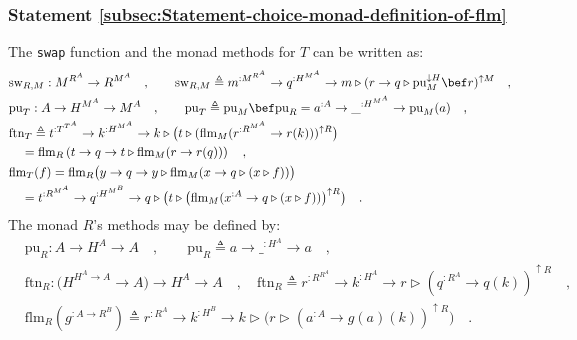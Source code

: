 \subsubsection{Statement \label{subsec:Statement-choice-monad-definition-of-flm}\ref{subsec:Statement-choice-monad-definition-of-flm}}

The \lstinline!swap! function and the monad methods for $T$ can
be written as:
\begin{align}
 & \text{sw}_{R,M}:M^{R^{A}}\rightarrow R^{M^{A}}\quad,\quad\quad\text{sw}_{R,M}\triangleq m^{:M^{R^{A}}}\rightarrow q^{:H^{M^{A}}}\rightarrow m\triangleright(r\rightarrow q\triangleright\text{pu}_{M}^{\downarrow H}\bef r)^{\uparrow M}\quad,\label{eq:rigid-monad-short-formula-for-swap}\\
 & \text{pu}_{T}:A\rightarrow H^{M^{A}}\rightarrow M^{A}\quad,\quad\quad\text{pu}_{T}\triangleq\text{pu}_{M}\bef\text{pu}_{R}=a^{:A}\rightarrow\_^{:H^{M^{A}}}\rightarrow\text{pu}_{M}(a)\quad,\nonumber \\
 & \text{ftn}_{T}\triangleq t^{:T^{T^{A}}}\rightarrow k^{:H^{M^{A}}}\rightarrow k\triangleright\big(t\triangleright(\text{flm}_{M}(r^{:R^{M^{A}}}\rightarrow r(k)))^{\uparrow R}\big)\nonumber \\
 & \quad=\text{flm}_{R}\left(t\rightarrow q\rightarrow t\triangleright\text{flm}_{M}(r\rightarrow r(q))\right)\quad,\\
 & \text{flm}_{T}(f)=\text{flm}_{R}\big(y\rightarrow q\rightarrow y\triangleright\text{flm}_{M}(x\rightarrow q\triangleright(x\triangleright f))\big)\label{eq:rigid-monad-def-flm-t-via-flm-r}\\
 & \quad=t^{:R^{M^{A}}}\rightarrow q^{:H^{M^{B}}}\rightarrow q\triangleright\big(t\triangleright\big(\text{flm}_{M}(x^{:A}\rightarrow q\triangleright(x\triangleright f))\big)^{\uparrow R}\big)\quad.\label{eq:rigid-monad-flm-T-def}
\end{align}
The monad $R$\textsf{'}s methods may be defined by:
\begin{align}
 & \text{pu}_{R}:A\rightarrow H^{A}\rightarrow A\quad,\quad\quad\text{pu}_{R}\triangleq a\rightarrow\_^{:H^{A}}\rightarrow a\quad,\nonumber \\
 & \text{ftn}_{R}:(H^{H^{A}\rightarrow A}\rightarrow A\big)\rightarrow H^{A}\rightarrow A\quad,\quad\text{ftn}_{R}\triangleq r^{:R^{R^{A}}}\rightarrow k^{:H^{A}}\rightarrow r\triangleright(q^{:R^{A}}\rightarrow q(k))^{\uparrow R}\quad,\nonumber \\
 & \text{flm}_{R}(g^{:A\rightarrow R^{B}})\triangleq r^{:R^{A}}\rightarrow k^{:H^{B}}\rightarrow k\triangleright\big(r\triangleright(a^{:A}\rightarrow g(a)(k))^{\uparrow R}\big)\quad.\label{eq:rigid-monad-flm-R-def}
\end{align}


